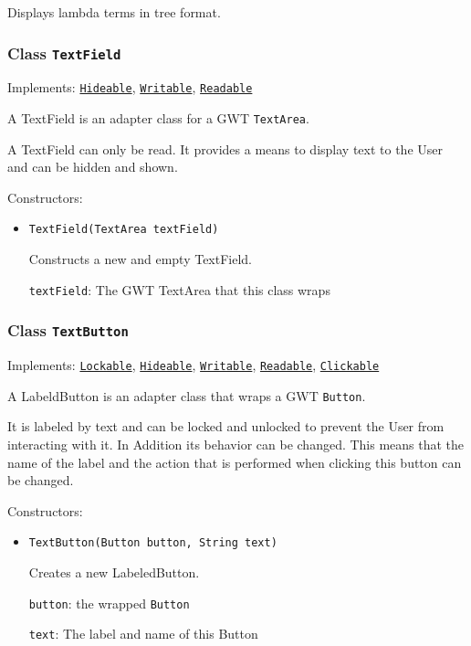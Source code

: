Displays lambda terms in tree format.

\subsubsection{Class \texttt{TextField}}
\label{type:edu.kit.wavelength.client.view.webui.component.TextField}
Implements: \texttt{\hyperref[type:edu.kit.wavelength.client.view.api.Hideable]{Hideable}}, \texttt{\hyperref[type:edu.kit.wavelength.client.view.api.Writable]{Writable}}, \texttt{\hyperref[type:edu.kit.wavelength.client.view.api.Readable]{Readable}}

A TextField is an adapter class for a GWT \texttt{TextArea}.
 
 A TextField can only be read. It provides a means to display text to the User
 and can be hidden and shown.

Constructors:
\begin{itemize}
\item \texttt{TextField(TextArea textField)}

Constructs a new and empty TextField.

\texttt{textField}: The GWT TextArea that this class wraps

\end{itemize}

\subsubsection{Class \texttt{TextButton}}
\label{type:edu.kit.wavelength.client.view.webui.component.TextButton}
Implements: \texttt{\hyperref[type:edu.kit.wavelength.client.view.api.Lockable]{Lockable}}, \texttt{\hyperref[type:edu.kit.wavelength.client.view.api.Hideable]{Hideable}}, \texttt{\hyperref[type:edu.kit.wavelength.client.view.api.Writable]{Writable}}, \texttt{\hyperref[type:edu.kit.wavelength.client.view.api.Readable]{Readable}}, \texttt{\hyperref[type:edu.kit.wavelength.client.view.api.Clickable]{Clickable}}

A LabeldButton is an adapter class that wraps a GWT \texttt{Button}.

 It is labeled by text and can be locked and unlocked to prevent the User
 from interacting with it. In Addition its behavior can be changed. This means
 that the name of the label and the action that is performed when clicking
 this button can be changed.

Constructors:
\begin{itemize}
\item \texttt{TextButton(Button button, String text)}

Creates a new LabeledButton.

\texttt{button}: the wrapped \texttt{Button}

\texttt{text}: The label and name of this Button

\end{itemize}

